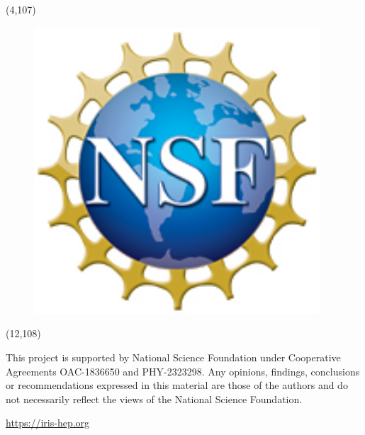 \documentclass[final]{beamer}
\begin{document}
\begin{frame}{}
\begin{textblock}{8.0}(4,107)
\begin{figure}[tbph]
\centering
\includegraphics[width=0.95\textwidth]{images/nsf1.jpg}
\end{figure}
\end{textblock}

\begin{textblock}{58.0}(12,108)
\begin{center}
This project is supported by National Science Foundation under Cooperative Agreements OAC-1836650 and PHY-2323298. Any opinions, findings, conclusions or recommendations expressed in this material are those of the authors and do not necessarily reflect the views of the National Science Foundation.
\end{center}
\begin{center}
\Large
\url{https://iris-hep.org}
\end{center}

\end{textblock}


\end{frame}
\end{document}

